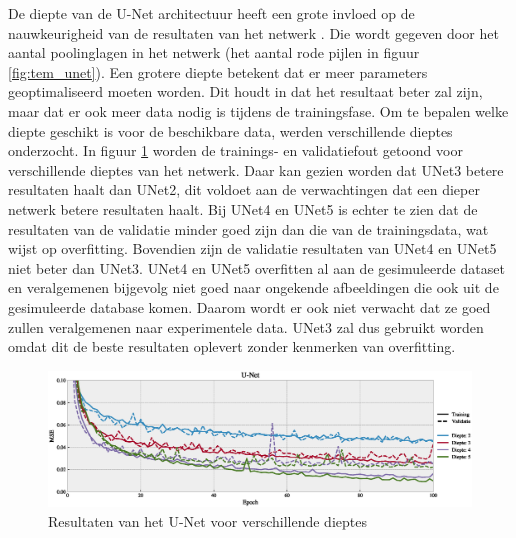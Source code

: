 \documentclass{report}
\begin{document}
De diepte van de U-Net architectuur heeft een grote invloed op de nauwkeurigheid van de resultaten van het netwerk \cite{paper:unet}. Die wordt gegeven door het aantal poolinglagen in het netwerk (het aantal rode pijlen in figuur \ref{fig:tem_unet}). Een grotere diepte betekent dat er meer parameters geoptimaliseerd moeten worden. Dit houdt in dat het resultaat beter zal zijn, maar dat er ook meer data nodig is tijdens de trainingsfase. Om te bepalen welke diepte geschikt is voor de beschikbare data, werden verschillende dieptes onderzocht. In figuur \ref{fig:nets_unet_depth} worden de trainings- en validatiefout getoond voor verschillende dieptes van het netwerk. Daar kan gezien worden dat UNet3 betere resultaten haalt dan UNet2, dit voldoet aan de verwachtingen dat een dieper netwerk betere resultaten haalt. Bij UNet4 en UNet5 is echter te zien dat de resultaten van de validatie minder goed zijn dan die van de trainingsdata, wat wijst op overfitting. Bovendien zijn de validatie resultaten van UNet4 en UNet5 niet beter dan UNet3. UNet4 en UNet5 overfitten al aan de gesimuleerde dataset en veralgemenen bijgevolg niet goed naar ongekende afbeeldingen die ook uit de gesimuleerde database komen. Daarom wordt er ook niet verwacht dat ze goed zullen veralgemenen naar experimentele data. UNet3 zal dus gebruikt worden omdat dit de beste resultaten oplevert zonder kenmerken van overfitting.
\begin{figure}[h!]
	\centering
	\includegraphics[width=15cm]{images/nets/unet_depth.eps}
	\caption{Resultaten van het U-Net voor verschillende dieptes}
	\label{fig:nets_unet_depth}
\end{figure}
\end{document}
